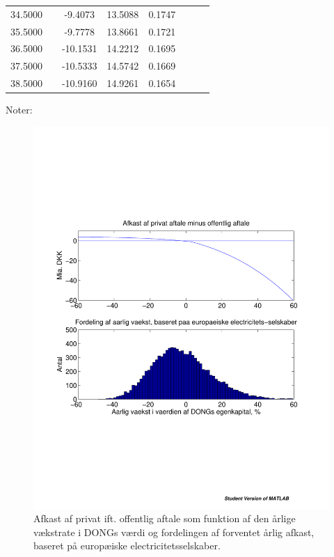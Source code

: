 \documentclass{article}
\begin{document}
\begin{table}[h]
\begin{tabularx}{0.95\linewidth}{cXcccccr}
34.5000&&-9.4073&13.5088& 0.1747\\
35.5000&&-9.7778&13.8661& 0.1721\\
36.5000&&-10.1531&14.2212& 0.1695\\
37.5000&&-10.5333&14.5742& 0.1669\\
38.5000&&-10.9160&14.9261& 0.1654\\
		\bottomrule[1pt]
	\end{tabularx}
	\begin{minipage}{\linewidth}
		\footnotesize{Noter: }
	\end{minipage}
\end{table}


\begin{figure}
\includegraphics[scale=0.8]{../matlab/figs/afkast_hist_combine_elec}
\caption{Afkast af privat ift. offentlig aftale som funktion af den årlige v\ae{}kstrate i DONGs v\ae{}rdi og fordelingen af forventet \aa{}rlig afkast, baseret p\aa{} europ\ae{}iske electricitetsselskaber.}
\label{fig:combine1}
\end{figure}
\end{document}
